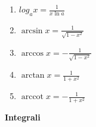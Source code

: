 \begin{center}
\begin{small}
\begin{enumerate}
            \item \begin{math}
                log_a x = \frac{1}{x \ln a}
            \end{math}
            \item \begin{math}
                \arcsin x = \frac{1}{\sqrt {1 - x^2}}
            \end{math}
            \item \begin{math}
                \arccos x = - \frac{1}{\sqrt{1 - x^2}}
            \end{math}
            \item \begin{math}
                \arctan x = \frac{1}{1 + x^2}
            \end{math}
            \item \begin{math}
                \operatorname{arccot}x = -\frac{1}{1 + x^2}
            \end{math}
        \end{enumerate}
    \end{small}
\end{center}
\textbf{Integrali}
